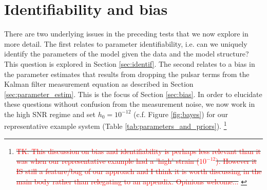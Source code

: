\documentclass[fleqn,usenatbib,useAMS]{mnras}
\providecommand{\DIFdel}[1]{{\protect\color{red}\sout{#1}}}                      %
\providecommand{\DIFdelbegin}{} %
\providecommand{\DIFdelend}{} %
\newcommand{\DIFscaledelfig}{0.5}
\newlength{\DIFdelgraphicswidth} %
\newlength{\DIFdelgraphicsheight} %
\newcommand{\DIFdelincludegraphics}[2][]{%
\sbox{\DIFdelgraphicsbox}{\DIFOincludegraphics[#1]{#2}}%
\settoboxwidth{\DIFdelgraphicswidth}{\DIFdelgraphicsbox} %
\settoboxtotalheight{\DIFdelgraphicsheight}{\DIFdelgraphicsbox} %
\scalebox{\DIFscaledelfig}{%
\parbox[b]{\DIFdelgraphicswidth}{\usebox{\DIFdelgraphicsbox}\\[-\baselineskip] \rule{\DIFdelgraphicswidth}{0em}}\llap{\resizebox{\DIFdelgraphicswidth}{\DIFdelgraphicsheight}{%
\setlength{\unitlength}{\DIFdelgraphicswidth}%
\begin{picture}(1,1)%
\thicklines\linethickness{2pt} %
{\color[rgb]{1,0,0}\put(0,0){\framebox(1,1){}}}%
{\color[rgb]{1,0,0}\put(0,0){\line( 1,1){1}}}%
{\color[rgb]{1,0,0}\put(0,1){\line(1,-1){1}}}%
\end{picture}%
}\hspace*{3pt}}} %
} %
\DeclareRobustCommand{\DIFdelbegin}{\DIFOdelbegin \let\includegraphics\DIFdelincludegraphics} %
\DeclareRobustCommand{\DIFdelend}{\DIFOaddend \let\includegraphics\DIFOincludegraphics} %
\begin{document}
\section{Identifiability and bias} \label{sec:bias_and_identifiability}
There are two underlying issues in the preceding tests that we now explore in more detail. The first relates to parameter identifiability, i.e. can we uniquely identify the parameters of the model given the data and the model structure? This question is explored in Section \ref{sec:identif}. The second relates to a bias in the parameter estimates that results from dropping the pulsar terms from the Kalman filter measurement equation as described in Section \ref{sec:parameter_estim}. This is the focus of Section \ref{sec:bias}. In order to elucidate these questions without confusion from the measurement noise, we now work in the high SNR regime and set $h_0 = 10^{-12}$ (c.f. Figure \ref{fig:bayes}) for our representative example system (Table \ref{tab:parameters_and_priors}).
\DIFdelbegin \footnote{%
\DIFdel{\textcolor{red}{TK: This discussion on bias and identifiability is perhaps less relevant than it was when our representative example had a 'high' strain ($10^{-12}$). However it IS still a feature/bug of our approach and I think it is worth discussing in the main body rather than relegating to an appendix. Opinions welcome...} }%
}
\addtocounter{footnote}{-1}%
\DIFdelend 
\end{document}
